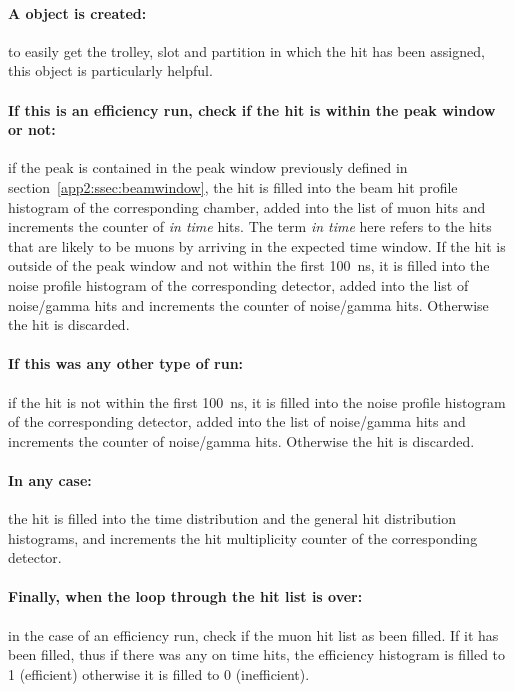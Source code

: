 	\paragraph{A  object is created:} to easily get the trolley, slot and partition in which the hit has been assigned, this object is particularly helpful.
	
	\paragraph{If this is an efficiency run, check if the hit is within the peak window or not:} if the peak is contained in the peak window previously defined in section~\ref{app2:ssec:beamwindow}, the hit is filled into the beam hit profile histogram of the corresponding chamber, added into the list of muon hits and increments the counter of \textit{in time} hits. The term \textit{in time} here refers to the hits that are likely to be muons by arriving in the expected time window. If the hit is outside of the peak window and not within the first \SI{100}{ns}, it is filled into the noise profile histogram of the corresponding detector, added into the list of noise/gamma hits and increments the counter of noise/gamma hits. Otherwise the hit is discarded.
	
	\paragraph{If this was any other type of run:} if the hit is not within the first \SI{100}{ns}, it is filled into the noise profile histogram of the corresponding detector, added into the list of noise/gamma hits and increments the counter of noise/gamma hits. Otherwise the hit is discarded.
	
	\paragraph{In any case:} the hit is filled into the time distribution and the general hit distribution histograms, and increments the hit multiplicity counter of the corresponding detector.
	
	\paragraph{Finally, when the loop through the hit list is over:} in the case of an efficiency run, check if the muon hit list as been filled. If it has been filled, thus if there was any on time hits, the efficiency histogram is filled to 1 (efficient) otherwise it is filled to 0 (inefficient).
	
\clearpage{\pagestyle{empty}\cleardoublepage}